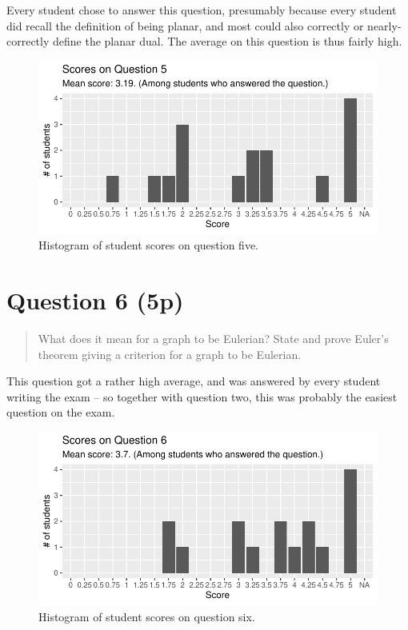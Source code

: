 \documentclass[nobib]{tufte-handout}
\begin{document}
Every student chose to answer this question, presumably because every student did recall the definition of being planar, and most could also correctly or nearly-correctly define the planar dual. The average on this question is thus fairly high.

\begin{figure}[p]
  \centering
  \includegraphics[width = \textwidth]{Q5.pdf}
  \caption[Score histogram for Q5]{Histogram of student scores on question five.}
  \label{fig:Q5}
\end{figure}

\section{Question 6 (5p)} %

\begin{quotation}
  What does it mean for a graph to be Eulerian? State and prove Euler's theorem giving a criterion for a graph to be Eulerian.
\end{quotation}

This question got a rather high average, and was answered by every student writing the exam -- so together with question two, this was probably the easiest question on the exam.

\begin{figure}[p]
  \centering
  \includegraphics[width = \textwidth]{Q6.pdf}
  \caption[Score histogram for Q6]{Histogram of student scores on question six.}
  \label{fig:Q6}
\end{figure}
\end{document}
